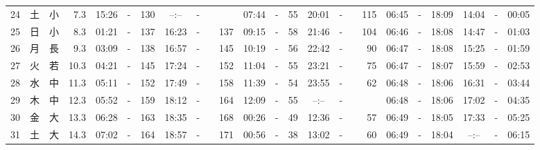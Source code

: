 \documentclass[12pt,a4j]{jsarticle}
\begin{document}
\begin{table}[htbp]
\begin{center}
{\begin{tabular}{|rc|cr|ccrccr|ccrccr|ccc|ccc|}
24 & 土 & 小 &  7.3 &  15:26 &-& 130 &  --:-- &-&~~~~~ &  07:44 &-&  55 &  20:01 &-& 115 & 06:45 & -& 18:09 & 14:04 & -& 00:05 \\
25 & 日 & 小 &  8.3 &  01:21 &-& 137 &  16:23 &-& 137 &  09:15 &-&  58 &  21:46 &-& 104 & 06:46 & -& 18:08 & 14:47 & -& 01:03 \\
26 & 月 & 長 &  9.3 &  03:09 &-& 138 &  16:57 &-& 145 &  10:19 &-&  56 &  22:42 &-&  90 & 06:47 & -& 18:08 & 15:25 & -& 01:59 \\
27 & 火 & 若 & 10.3 &  04:21 &-& 145 &  17:24 &-& 152 &  11:04 &-&  55 &  23:21 &-&  75 & 06:47 & -& 18:07 & 15:59 & -& 02:53 \\
28 & 水 & 中 & 11.3 &  05:11 &-& 152 &  17:49 &-& 158 &  11:39 &-&  54 &  23:55 &-&  62 & 06:48 & -& 18:06 & 16:31 & -& 03:44 \\
29 & 木 & 中 & 12.3 &  05:52 &-& 159 &  18:12 &-& 164 &  12:09 &-&  55 &  --:-- &-&~~~~~ & 06:48 & -& 18:06 & 17:02 & -& 04:35 \\
30 & 金 & 大 & 13.3 &  06:28 &-& 163 &  18:35 &-& 168 &  00:26 &-&  49 &  12:36 &-&  57 & 06:49 & -& 18:05 & 17:33 & -& 05:25 \\
31 & 土 & 大 & 14.3 &  07:02 &-& 164 &  18:57 &-& 171 &  00:56 &-&  38 &  13:02 &-&  60 & 06:49 & -& 18:04 & --:-- & -& 06:15 \\
   \hline
   \end{tabular}}
   \end{center}
\end{table}
\newpage
\end{document}
